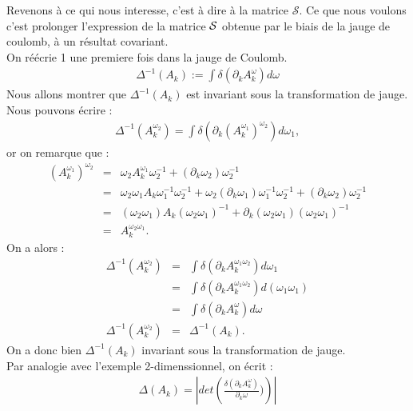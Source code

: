 \documentclass[a4paper,11pt]{article} %
\theoremstyle{plain}
\theoremstyle{definition}
\theoremstyle{remark}
\numberwithin{equation}{section}
\numberwithin{equation}{subsection}
\numberwithin{figure}{section}
\begin{document}
\noindent
Revenons à ce qui nous interesse, c'est à dire à la matrice $\mathcal{S}$. Ce que nous voulons c'est prolonger l'expression de la matrice $\cal{S}$ 
obtenue par le biais de la jauge de coulomb, à un résultat covariant.\\
On réécrie 1 une premiere fois dans la jauge de Coulomb.
\begin{eqnarray*}
 \Delta^{-1}(A_{k}):= \int \delta \left(\partial_{k}A^{\omega}_{k}\right)d\omega
\end{eqnarray*}
Nous allons montrer que $\Delta^{-1}(A_{k})$ est invariant sous la transformation de jauge.\\
Nous pouvons écrire :
\begin{eqnarray*}
 \Delta^{-1}(A^{\omega_{2}}_{k})= \int \delta \left(\partial_{k}(A_{k}^{\omega_{1}})^{\omega_{2}}\right)d\omega_{1} ,
\end{eqnarray*}
or on remarque que : 
\begin{eqnarray*}
 (A_{k}^{\omega_{1}})^{\omega_{2}} &=& \omega_{2}A_{k}^{\omega_{1}}\omega_{2}^{-1} + (\partial_{k}\omega_{2}) \omega_{2}^{-1}\\
                                     &=& \omega_{2}\omega_{1}A_{k}\omega_{1}^{-1}\omega_{2}^{-1} + 
\omega_{2}(\partial_{k}\omega_{1})\omega_{1}^{-1}\omega_{2}^{-1} + (\partial_{k}\omega_{2})\omega_{2}^{-1}\\
                                     &=& (\omega_{2}\omega_{1})A_{k}(\omega_{2}\omega_{1})^{-1} + 
\partial_{k}(\omega_{2}\omega_{1})(\omega_{2}\omega_{1})^{-1} \\
                                    &=& A_{k}^{\omega_{2}\omega_{1}}.
\end{eqnarray*}
On a alors : 
\begin{eqnarray*}
 \Delta^{-1}(A^{\omega_{2}}_{k})&=& \int \delta \left(\partial_{k}A_{k}^{\omega_{1}\omega_{2}}\right)d\omega_{1}\\
                                  &=& \int \delta \left(\partial_{k}A_{k}^{\omega_{1}\omega_{2}}\right)d(\omega_{1}\omega_{1})\\
                                  &=& \int \delta \left(\partial_{k}A_{k}^{\omega}\right)d\omega\\
 \Delta^{-1}(A^{\omega_{2}}_{k})&=& \Delta^{-1}(A_{k}).
\end{eqnarray*}
On a donc bien $\Delta^{-1}(A_{k})$ invariant sous la transformation de jauge. \\
Par analogie avec l'exemple 2-dimenssionnel, on écrit :
\begin{eqnarray*}
 \Delta(A_{k}) = \left|det\left(\frac {\delta(\partial_{k}A^{\omega}_{k})}{\partial_{k}\omega})\right)\right|
\end{eqnarray*}
\end{document}
